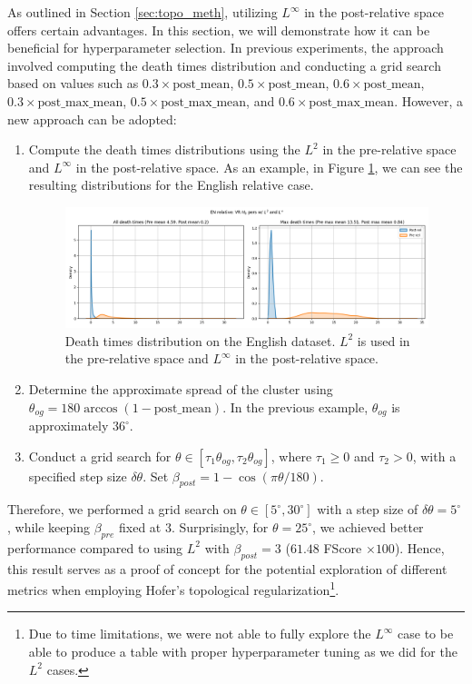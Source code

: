 \documentclass[../main.tex]{subfiles}
\begin{document}
As outlined in Section \ref{sec:topo_meth}, utilizing $L^\infty$ in the post-relative space offers certain advantages. In this section, we will demonstrate how it can be beneficial for hyperparameter selection. In previous experiments, the approach involved computing the death times distribution and conducting a grid search based on values such as $0.3\times \text{post\_mean}$, $0.5\times \text{post\_mean}$, $0.6\times \text{post\_mean}$, $0.3\times \text{post\_max\_mean}$, $0.5\times \text{post\_max\_mean}$, and $0.6\times \text{post\_max\_mean}$. However, a new approach can be adopted:
\begin{enumerate}
    \item Compute the death times distributions using the $L^2$ in the pre-relative space and $L^\infty$ in the post-relative space. As an example, in Figure \ref{fig:distMix}, we can see the resulting distributions for the English relative case.

    \begin{figure}[!ht]
        \centering
        \includegraphics[width=\textwidth]{figures/rs/mix_en_relative_seed0.png} 
        \caption{Death times distribution on the English dataset. $L^2$ is used in the pre-relative space and $L^\infty$ in the post-relative space.}
        \label{fig:distMix}
    \end{figure}

    \item Determine the approximate spread of the cluster using $\theta_{og} = 180 \arccos(1-\text{post\_mean})$. In the previous example, $\theta_{og}$ is approximately $36^{\circ}$.
    
    \item Conduct a grid search for $\theta \in [\tau_1 \theta_{og}, \tau_2\theta_{og}]$, where $\tau_1\geq 0$ and $\tau_2> 0$, with a specified step size $\delta \theta$. Set $\beta_{post} = 1-\cos(\pi \theta / 180)$.
\end{enumerate}


Therefore, we performed a grid search on $\theta \in [5^{\circ}, 30^{\circ}]$ with a step size of $\delta \theta = 5^{\circ}$, while keeping $\beta_{pre}$ fixed at 3. Surprisingly, for $\theta = 25^{\circ}$, we achieved better performance compared to using $L^2$ with $\beta_{post} = 3$ ($61.48$ FScore $\times 100$). Hence, this result serves as a proof of concept for the potential exploration of different metrics when employing Hofer's topological regularization\footnote{Due to time limitations, we were not able to fully explore the $L^\infty$ case to be able to produce a table with proper hyperparameter tuning as we did for the $L^2$ cases.}.
\end{document}
